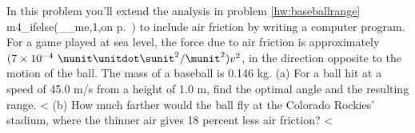 In this problem you'll extend the analysis in problem
        \ref{hw:baseballrange} 
        m4_ifelse(__me,1,on p.~\pageref{hw:baseballrange})
        to include air friction by writing a computer program. For a game played at
        sea level, the force due to air friction
        is approximately $(7\times10^{-4}\ \nunit\unitdot\sunit^2/\munit^2)v^2$,
        in the direction opposite to the motion of the ball.%
The mass of a
        baseball is 0.146 kg.\hwendpart
        (a) For a ball hit at a speed
        of 45.0 m/s from a height of 1.0 m, find the optimal angle and the resulting
        range.         <%
        (b) How much farther would the ball fly at the Colorado Rockies' stadium,
        where the thinner air gives 18 percent less air friction? 
        <%
